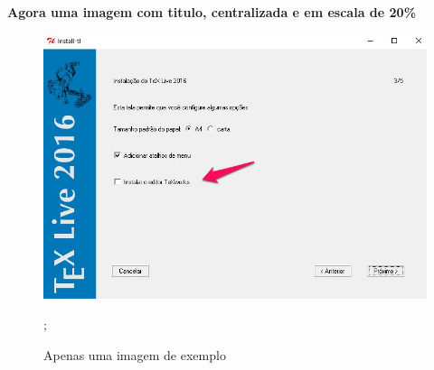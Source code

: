 \documentclass{article}
\begin{document}
\textbf{Agora uma imagem com titulo, centralizada e em escala de 20\%}

\begin{figure}[H]
  \centering
  \includegraphics[scale=0.2]{docs/texlive-install.jpg}
  \caption{Apenas uma imagem de exemplo};
  \label{fig:um_exemplo}
\end{figure}
\end{document}
